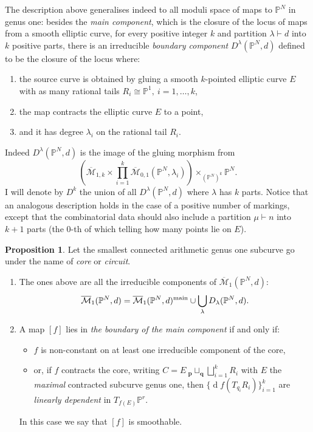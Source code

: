 \documentclass[11pt]{amsart}
\newcommand{\oM}{\overline{\mathcal{M}}}
\newcommand{\M}[4]{\overline{\mathcal{M}}_{#1,#2}(#3,#4)}
\newcommand{\PP}{\mathbb P}
\theoremstyle{definition}
\newtheorem{prop}[thm]{Proposition}
\theoremstyle{definition}
\begin{document}
The description above generalises indeed to all moduli space of maps to $\PP^N$ in genus one:
besides the \emph{main component}, which is the closure of the locus of maps from a smooth elliptic curve, for every positive integer $k$ and partition $\lambda\vdash d$ into $k$ positive parts, there is an irreducible \emph{boundary component} $D^{\lambda}(\PP^N,d)$ defined to be the closure of the locus where:
\begin{enumerate}[label=(\roman*)]
\item the source curve is obtained by gluing a smooth $k$-pointed elliptic curve $E$ with as many rational tails $R_i\cong\PP^1,\ i=1,\ldots,k$,
\item the map contracts the elliptic curve $E$ to a point, 
\item and it has degree $\lambda_i$ on the rational tail $R_i$.
\end{enumerate}
Indeed $D^{\lambda}(\PP^N,d)$ is the image of the gluing morphism from
\[\left(\oM_{1,k}\times\prod_{i=1}^k\M{0}{1}{\PP^N}{\lambda_i}\right)\times_{(\PP^N)^k}\PP^N.\]
I will denote by $D^k$ the union of all $D^{\lambda}(\PP^N,d)$ where $\lambda$ has $k$ parts. Notice that an analogous description holds in the case of a positive number of markings, except that the combinatorial data should also include a partition $\mu\vdash n$ into $k+1$ parts (the $0$-th of which telling how many points lie on $E$).

\begin{prop}\label{prop:components} Let the smallest connected arithmetic genus one subcurve go under the name of \emph{core} or \emph{circuit}.
\begin{enumerate}
 \item The ones above are all the irreducible components of $\oM_1(\PP^N,d)$: 
\[\oM_1(\PP^N,d)=\oM_1(\PP^N,d)^{\rm{main}}\cup\bigcup_{\lambda}D_{\lambda}(\PP^N,d).\]
\item A map $[f]$ lies in \emph{the boundary of the main component}  if and only if:
\begin{itemize}[leftmargin=0cm]
\item $f$ is non-constant on at least one irreducible component of the core,
\item or, if $f$ contracts the core, writing $C=E\ {}_{\mathbf p}\!\sqcup_{\mathbf q}\bigsqcup_{i=1}^k R_i$ with $E$ the \emph{maximal} contracted subcurve genus one, then $\{\operatorname{d}\!f(T_{q_i}R_i)\}_{i=1}^k$ are \emph{linearly dependent} in $T_{f(E)}\PP^r$.
\end{itemize}
In this case we say that $[f]$ is smoothable.
\end{enumerate}
\end{prop}
 
\end{document}
